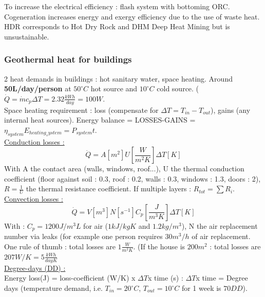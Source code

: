 \documentclass[../main.tex]{subfiles}
\begin{document}
To increase the electrical efficiency : flash system with bottoming ORC. Cogeneration increases energy and exergy efficiency due to the use of waste heat. \\

HDR corresponds to Hot Dry Rock and DHM Deep Heat Mining but is unsustainable.\\

\subsubsection{Geothermal heat for buildings}
2 heat demands in buildings : hot sanitary water, space heating. Around \textbf{50L/day/person} at $50^\circ C$ hot source and $10^\circ C$ cold source. ($\dot{Q} = \dot{m}c_p \Delta T = 2.32 \frac{kWh}{day} = 100W$.\\

Space heating requirement : loss (compensate for $\Delta T = T_{in}-T_{out}$), gains (any internal heat sources). Energy balance = LOSSES-GAINS = $\eta_{system} E_{heating_system} = P_{system} t$.\\

\quad \underline{Conduction losses : }\\
\begin{equation}
    \dot{Q} = A [m^2] U [\frac{W}{m^2 K}] \Delta T[K]
\end{equation}
With A the contact area (walls, windows, roof...), U the thermal conduction coefficient (floor against soil : 0.3, roof : 0.2, walls : 0.3, windows : 1.3, doors : 2), $R = \frac{1}{U}$ the thermal resistance coefficient. \warning If multiple layers : $R_{tot} = \sum R_i$.\\

\quad \underline{Convection losses : }\\
\begin{equation}
    \dot{Q} = V[m^3] N [s^{-1}] C_p [\frac{J}{m^3 K}] \Delta T [K]
\end{equation}
With : $C_p = 1200 J/m^3L$ for air ($1kJ/kgK$ and $1.2 kg/m^3$), N the air replacement number via leaks (for example one person requires $30m^3/h$ of air replacement.\\

One rule of thumb : total losses are $1\frac{W}{m^2 K}$. (If the house is $200m^2$ : total losses are $207W/K  = 5 \frac{kWh}{dayK}$\\

\quad \underline{Degree-days (DD) :}\\
Energy loss(J) = loss-coefficient (W/K) x $\Delta T$x time (s) : $\Delta T$x time = Degree days (temperature demand, i.e. $T_{in} = 20^\circ C$, $T_{out} = 10^\circ C$ for 1 week is $70 DD$).\\
\end{document}
